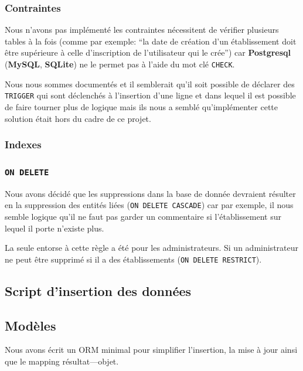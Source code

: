 \documentclass[10pt,a4paper]{article}
\begin{document}
\subsubsection{Contraintes}

Nous n'avons pas implémenté les contraintes nécessitent de vérifier plusieurs tables à la fois (comme par exemple: ``la date de création d'un établissement doit être supérieure à celle d'inscription de l'utilisateur qui le crée'') car \textbf{Postgresql} (\textbf{MySQL}, \textbf{SQLite}) ne le permet pas à l'aide du mot clé \texttt{CHECK}.

Nous nous sommes documentés et il semblerait qu'il soit possible de déclarer des \texttt{TRIGGER} qui sont déclenchés à l'insertion d'une ligne et dans lequel il est possible de faire tourner plus de logique mais ils nous a semblé qu'implémenter cette solution était hors du cadre de ce projet.

\subsubsection{Indexes}



\subsubsection{\texttt{ON DELETE}}

Nous avons décidé que les suppressions dans la base de donnée devraient résulter en la suppression des entités liées (\texttt{ON DELETE CASCADE}) car par exemple, il nous semble logique qu'il ne faut pas garder un commentaire si l'établissement sur lequel il porte n'existe plus.

La seule entorse à cette règle a été pour les administrateurs. Si un administrateur ne peut être supprimé si il a des établissements (\texttt{ON DELETE RESTRICT}).

\subsection{Script d'insertion des données}


\subsection{Modèles}

Nous avons écrit un ORM minimal pour simplifier l'insertion, la mise à jour ainsi que le mapping résultat---objet.
\end{document}
